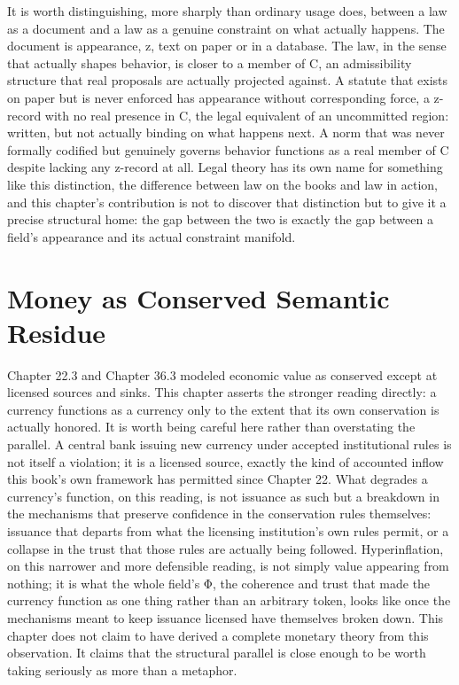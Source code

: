 It is worth distinguishing, more sharply than ordinary usage does, between a law as a document and a law as a genuine constraint on what actually happens. The document is appearance, z, text on paper or in a database. The law, in the sense that actually shapes behavior, is closer to a member of C, an admissibility structure that real proposals are actually projected against. A statute that exists on paper but is never enforced has appearance without corresponding force, a z-record with no real presence in C, the legal equivalent of an uncommitted region: written, but not actually binding on what happens next. A norm that was never formally codified but genuinely governs behavior functions as a real member of C despite lacking any z-record at all. Legal theory has its own name for something like this distinction, the difference between law on the books and law in action, and this chapter's contribution is not to discover that distinction but to give it a precise structural home: the gap between the two is exactly the gap between a field's appearance and its actual constraint manifold.

\section{Money as Conserved Semantic Residue}

Chapter 22.3 and Chapter 36.3 modeled economic value as conserved except at licensed sources and sinks. This chapter asserts the stronger reading directly: a currency functions as a currency only to the extent that its own conservation is actually honored. It is worth being careful here rather than overstating the parallel. A central bank issuing new currency under accepted institutional rules is not itself a violation; it is a licensed source, exactly the kind of accounted inflow this book's own framework has permitted since Chapter 22. What degrades a currency's function, on this reading, is not issuance as such but a breakdown in the mechanisms that preserve confidence in the conservation rules themselves: issuance that departs from what the licensing institution's own rules permit, or a collapse in the trust that those rules are actually being followed. Hyperinflation, on this narrower and more defensible reading, is not simply value appearing from nothing; it is what the whole field's Φ, the coherence and trust that made the currency function as one thing rather than an arbitrary token, looks like once the mechanisms meant to keep issuance licensed have themselves broken down. This chapter does not claim to have derived a complete monetary theory from this observation. It claims that the structural parallel is close enough to be worth taking seriously as more than a metaphor.

